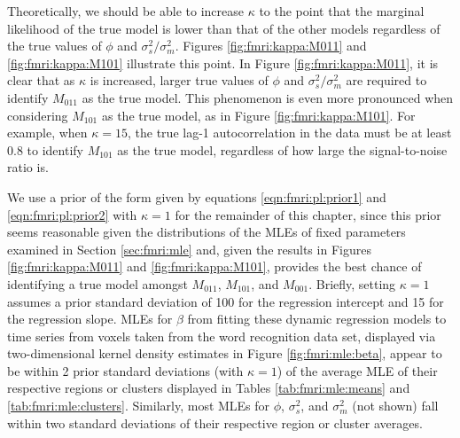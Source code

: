 Theoretically, we should be able to increase $\kappa$ to the point that the marginal likelihood of the true model is lower than that of the other models regardless of the true values of $\phi$ and $\sigma^2_s / \sigma^2_m$. Figures \ref{fig:fmri:kappa:M011} and \ref{fig:fmri:kappa:M101} illustrate this point. In Figure \ref{fig:fmri:kappa:M011}, it is clear that as $\kappa$ is increased, larger true values of $\phi$ and $\sigma^2_s / \sigma^2_m$ are required to identify $M_{011}$ as the true model. This phenomenon is even more pronounced when considering $M_{101}$ as the true model, as in Figure \ref{fig:fmri:kappa:M101}. For example, when $\kappa = 15$, the true lag-1 autocorrelation in the data must be at least 0.8 to identify $M_{101}$ as the true model, regardless of how large the signal-to-noise ratio is.

We use a prior of the form given by equations \eqref{eqn:fmri:pl:prior1} and \eqref{eqn:fmri:pl:prior2} with $\kappa = 1$ for the remainder of this chapter, since this prior seems reasonable given the distributions of the MLEs of fixed parameters examined in Section \ref{sec:fmri:mle} and, given the results in Figures \ref{fig:fmri:kappa:M011} and \ref{fig:fmri:kappa:M101}, provides the best chance of identifying a true model amongst $M_{011}$, $M_{101}$, and $M_{001}$. Briefly, setting $\kappa = 1$ assumes a prior standard deviation of 100 for the regression intercept and 15 for the regression slope. MLEs for $\beta$ from fitting these dynamic regression models to time series from voxels taken from the word recognition data set, displayed via two-dimensional kernel density estimates in Figure \ref{fig:fmri:mle:beta}, appear to be within 2 prior standard deviations (with $\kappa = 1$) of the average MLE of their respective regions or clusters displayed in Tables \ref{tab:fmri:mle:means} and \ref{tab:fmri:mle:clusters}. Similarly, most MLEs for $\phi$, $\sigma^2_s$, and $\sigma^2_m$ (not shown) fall within two standard deviations of their respective region or cluster averages.


